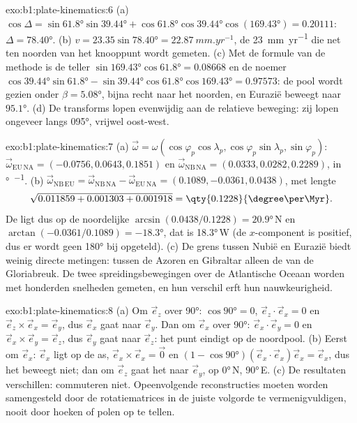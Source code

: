 \begin{solution}{exo:b1:plate-kinematics:6}
(a) $\cos\Delta = \sin\ang{61.8}\sin\ang{39.44} + \cos\ang{61.8}\cos\ang{39.44}
\cos(\ang{169.43}) = 0.20111$: $\Delta = \ang{78.40}$. (b) $v = 23.35
\sin\ang{78.40} = \qty{22.87}{mm.yr^{-1}}$, de \qty{23}{mm.yr^{-1}} die net ten noorden van het knooppunt wordt gemeten. (c) Met de formule van de methode is de teller
$\sin\ang{169.43}\cos\ang{61.8} = 0.08668$ en de noemer
$\cos\ang{39.44}\sin\ang{61.8} - \sin\ang{39.44}\cos\ang{61.8}\cos\ang{169.43}
= 0.97573$: de pool wordt gezien onder $\beta = \ang{5.08}$, bijna recht naar het noorden, en Eurazië beweegt naar $\ang{95.1}$. (d) De transforms lopen evenwijdig aan de relatieve beweging: zij lopen ongeveer langs \ang{095}, vrijwel oost-west.
\end{solution}

\begin{solution}{exo:b1:plate-kinematics:7}
(a) $\vec\omega = \omega(\cos\varphi_p\cos\lambda_p, \cos\varphi_p\sin\lambda_p,
\sin\varphi_p)$: $\vec\omega_{\mathrm{EU\,NA}} = (-0.0756, 0.0643, 0.1851)$ en
$\vec\omega_{\mathrm{NB\,NA}} = (0.0333, 0.0282, 0.2289)$, in
\unit{\degree\per\Myr}. (b) $\vec\omega_{\mathrm{NB\,EU}} =
\vec\omega_{\mathrm{NB\,NA}} - \vec\omega_{\mathrm{EU\,NA}} = (0.1089, -0.0361,
0.0438)$, met lengte
\[
  \sqrt{0.011859 + 0.001303 + 0.001918} = \qty{0.1228}{\degree\per\Myr}.
\]
De  ligt dus op de noordelijke 
$\arcsin(0.0438/0.1228) = \ang{20.9}$\,N en  $\arctan(-0.0361/0.1089) = \ang{-18.3}$, dat is \ang{18.3}\,W (de $x$-component is positief, dus er wordt geen \ang{180} bij opgeteld). (c) De grens tussen Nubië en Eurazië biedt weinig directe metingen: tussen de Azoren en Gibraltar alleen de  van de Gloriabreuk. De twee spreidingsbewegingen over de Atlantische Oceaan worden met honderden snelheden gemeten, en hun verschil erft hun nauwkeurigheid.
\end{solution}

\begin{solution}{exo:b1:plate-kinematics:8}
(a) Om $\vec e_z$ over \ang{90}: $\cos\ang{90} = 0$, $\vec e_z\cdot\vec e_x = 0$
en $\vec e_z\times\vec e_x = \vec e_y$, dus $\vec e_x$ gaat naar $\vec e_y$. Dan om $\vec e_x$ over \ang{90}: $\vec e_x\cdot\vec e_y = 0$ en
$\vec e_x\times\vec e_y = \vec e_z$, dus $\vec e_y$ gaat naar $\vec e_z$: het punt eindigt op de noordpool. (b) Eerst om $\vec e_x$: $\vec e_x$ ligt op de as,
$\vec e_x\times\vec e_x = \vec 0$ en $(1 - \cos\ang{90})(\vec e_x\cdot\vec e_x)
\vec e_x = \vec e_x$, dus het beweegt niet; dan om $\vec e_z$ gaat het naar
$\vec e_y$, op \ang{0}\,N, \ang{90}\,E. (c) De resultaten verschillen:  commuteren niet. Opeenvolgende reconstructies moeten worden samengesteld door de rotatiematrices in de juiste volgorde te vermenigvuldigen, nooit door hoeken of polen op te tellen.
\end{solution}


